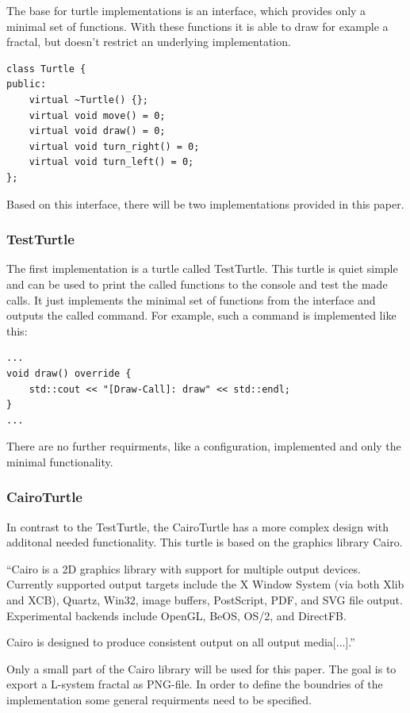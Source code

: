 \documentclass[english]{cpp-hmwk}
\begin{document}
The base for turtle implementations is an interface, which provides only a minimal set of functions. With these functions it is able to draw for example a fractal, but doesn't restrict an underlying implementation.

\medskip
\begin{lstlisting}
class Turtle {
public:
    virtual ~Turtle() {};
    virtual void move() = 0;
    virtual void draw() = 0;
    virtual void turn_right() = 0;
    virtual void turn_left() = 0;
};
\end{lstlisting}

\noindent Based on this interface, there will be two implementations provided in this paper. 

\subsubsection{TestTurtle}

The first implementation is a turtle called TestTurtle. This turtle is quiet simple and can be used to print the called functions to the console and test the made calls.
It just implements the minimal set of functions from the interface and outputs the called command. For example, such a command is implemented like this:

\medskip
\begin{lstlisting}
...
void draw() override {
    std::cout << "[Draw-Call]: draw" << std::endl;
}
...
\end{lstlisting}

There are no further requirments, like a configuration, implemented and only the minimal functionality.

\subsubsection{CairoTurtle}
In contrast to the TestTurtle, the CairoTurtle has a more complex design with additonal needed functionality. This turtle is based on the graphics library Cairo.


``Cairo is a 2D graphics library with support for multiple output devices. Currently supported output targets include the X Window System (via both Xlib and XCB), Quartz, Win32, image buffers, PostScript, PDF, and SVG file output. Experimental backends include OpenGL, BeOS, OS/2, and DirectFB.

Cairo is designed to produce consistent output on all output media[...].''\cite[Cf.]{cairohp}


\noindent Only a small part of the Cairo library will be used for this paper. The goal is to export a L-system fractal as PNG-file. In order to define the boundries of the implementation some general requirments need to be specified.
\end{document}
